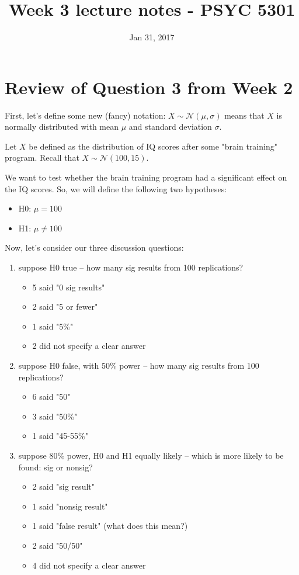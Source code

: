 \documentclass[11pt]{article}
\date{Jan 31, 2017}
\title{Week 3 lecture notes - PSYC 5301}
\begin{document}
\maketitle

\section*{Review of Question 3 from Week 2}
\label{sec-1}

First, let's define some new (fancy) notation:  $X \sim \mathcal{N}(\mu,\sigma)$ means that $X$ is normally distributed with mean $\mu$ and standard deviation $\sigma$.

Let $X$ be defined as the distribution of IQ scores after some "brain training" program.  Recall that $X \sim \mathcal{N}(100,15)$.

We want to test whether the brain training program had a significant effect on the IQ scores.  So, we will define the following two hypotheses:
\begin{itemize}
\item H0: $\mu=100$
\item H1: $\mu \neq 100$
\end{itemize}

Now, let's consider our three discussion questions:

\begin{enumerate}
\item suppose H0 true -- how many sig results from 100 replications?
\begin{itemize}
\item 5 said "0 sig results"
\item 2 said "5 or fewer"
\item 1 said "5\%"
\item 2 did not specify a clear answer
\end{itemize}

\item suppose H0 false, with 50\% power -- how many sig results from 100 replications?
\begin{itemize}
\item 6 said "50"
\item 3 said "50\%"
\item 1 said "45-55\%"
\end{itemize}

\item suppose 80\% power, H0 and H1 equally likely -- which is more likely to be found: sig or nonsig?
\begin{itemize}
\item 2 said "sig result"
\item 1 said "nonsig result"
\item 1 said "false result" (what does this mean?)
\item 2 said "50/50"
\item 4 did not specify a clear answer
\end{itemize}
\end{enumerate}
\end{document}
